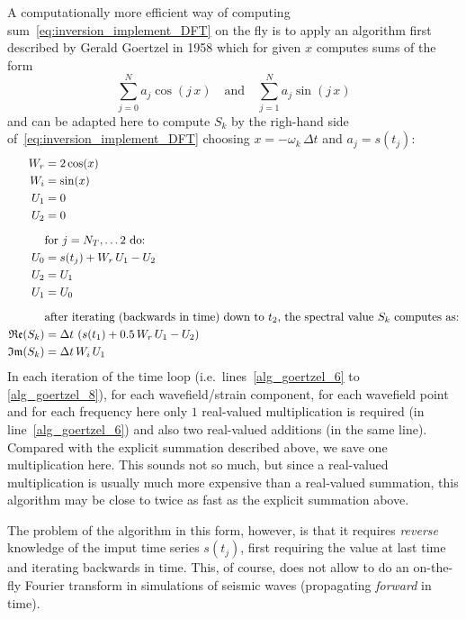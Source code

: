 \documentclass[12pt,a4paper]{article}
\begin{document}
A computationally more efficient way of computing sum~\eqref{eq:inversion_implement_DFT} on the fly
is to apply an algorithm first described by Gerald Goertzel in 1958 \cite{Goertzel58} which for given $x$ computes
sums of the form
\[
\sum_{j=0}^{N} a_j\cos(j\,x)\quad\text{and}\quad \sum_{j=1}^{N} a_j\sin(j\,x)
\]
and can be adapted here to compute $S_k$ by the righ-hand side of~\eqref{eq:inversion_implement_DFT} choosing 
$x = -\omega_k\,\Delta t$ and $a_j = s(t_j)$:
\begin{align}
  W_r &= 2\cos(x) \label{alg:goertzel_1}\\
  W_i &= \sin(x) \label{alg:goertzel_2}\\
  U_1 &= 0 \\
  U_2 &= 0 \\[1.5ex]
  &\text{for $j=N_T,\dots 2$ do:}\label{alg_goertzel_5}\\
  U_0 &= s(t_j) + W_r \, U_1 - U_2\label{alg_goertzel_6}\\
  U_2 &= U_1\\
  U_1 &= U_0 \label{alg_goertzel_8}\\[1.5ex]
  &\text{after iterating (backwards in time) down to $t_2$, the  spectral value $S_k$ computes as:}\notag\\
  \mathfrak{Re}(S_k) &= \Delta t\,\left(s(t_1) + 0.5\,W_r \, U_1 - U_2\right)\label{alg_goertzel_10}\\
  \mathfrak{Im}(S_k) &= \Delta t\,W_i \, U_1
\end{align}
In each iteration of the time loop (i.e.\ lines~\eqref{alg_goertzel_6} to \eqref{alg_goertzel_8}), 
for each wavefield/strain component, 
for each wavefield point and for each frequency here only $1$ real-valued multiplication is required
(in line~\eqref{alg_goertzel_6}) and also two real-valued additions (in the same line). Compared with the 
explicit summation described above, we save one multiplication here. This sounds not so much, but
since a real-valued multiplication is usually much more expensive than a real-valued summation, this algorithm
may be close to twice as fast as the explicit summation above. 

The problem of the algorithm in this form, however, is that it requires \emph{reverse} knowledge of the imput
time series $s(t_j)$, first requiring the value at last time and iterating backwards in time. This, of course,
does not allow to do an on-the-fly Fourier transform in simulations of seismic waves (propagating \emph{forward}
in time).
\end{document}
